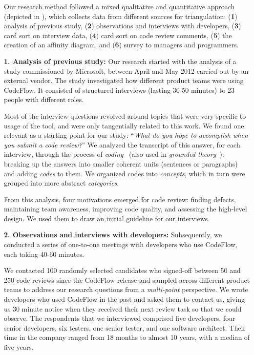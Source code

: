 Our research method followed a mixed qualitative and quantitative approach~\cite{creswell2009research} 
(depicted in ), which collects data from different sources for triangulation: (\textbf{1})
analysis of previous study, (\textbf{2}) observations and interviews with developers,
(\textbf{3}) card sort on interview data,  (\textbf{4}) card sort on code review comments, (\textbf{5})
the creation of an affinity diagram, and (\textbf{6}) survey to managers and
programmers.

\textbf{1. Analysis of previous study:} Our research started with the analysis of a
study commissioned by Microsoft, between April and May 2012 carried out by an
external vendor. The study investigated how different product teams were using
CodeFlow. It consisted of structured interviews (lasting 30-50 minutes) to 23
people with different roles.

Most of the interview questions revolved around topics that were very specific
to usage of the tool, and were only tangentially related to this work. We found one
relevant as a starting point for our study: ``\emph{What do you hope to accomplish
when you submit a code review?}'' We analyzed the transcript of this answer, for
each interview, through the process of \emph{coding}~\cite{berg2004qualitative} (also used in
\emph{grounded theory}~\cite{adolph2011using}): breaking up the answers into smaller coherent
units (sentences or paragraphs) and adding \emph{codes} to them. We organized codes
into \emph{concepts}, which in turn were grouped into more abstract \emph{categories}.

From this analysis, four motivations emerged for code review: finding defects,
maintaining team awareness, improving code quality, and assessing the
high-level design. We used them to draw an initial guideline for our
interviews.

\textbf{2. Observations and interviews with developers:} Subsequently, we conducted a series of
one-to-one meetings with developers who use CodeFlow, each taking 40-60
minutes. 

We contacted 100 randomly selected candidates who signed-off between 50 and 250 code
reviews since the CodeFlow release and sampled across different product teams
to address our research questions from a \emph{multi-point} perspective. We wrote
developers who used CodeFlow in the past and asked them to contact us, giving
us 30 minute notice when they received their next review task so that we could
observe.  The respondents that we interviewed comprised five developers, four
senior developers, six testers, one senior tester, and one software architect.
Their time in the company ranged from 18 months to almost 10 years, with a
median of five years. 


